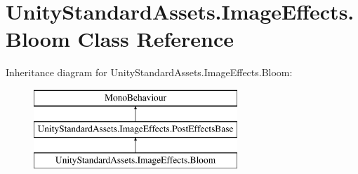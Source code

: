 \hypertarget{class_unity_standard_assets_1_1_image_effects_1_1_bloom}{}\section{Unity\+Standard\+Assets.\+Image\+Effects.\+Bloom Class Reference}
\label{class_unity_standard_assets_1_1_image_effects_1_1_bloom}
Inheritance diagram for Unity\+Standard\+Assets.\+Image\+Effects.\+Bloom\+:\begin{figure}[H]
\begin{center}
\leavevmode
\includegraphics[height=3.000000cm]{class_unity_standard_assets_1_1_image_effects_1_1_bloom}
\end{center}
\end{figure}
